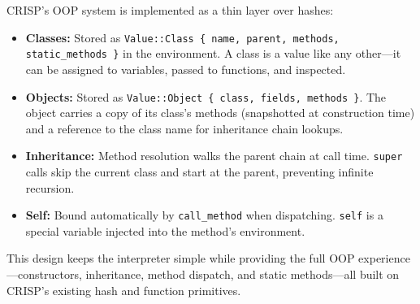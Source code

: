 \begin{tcolorbox}[colback=lightlavender, colframe=softvioletdark, title=\textbf{\textcolor{darkpurple}{Design Note: OOP Implementation}}, fonttitle=\bfseries, sharp corners]
CRISP's OOP system is implemented as a thin layer over hashes:

\begin{itemize}
    \item \textbf{Classes:} Stored as \texttt{Value::Class \{ name, parent, methods, static\_methods \}} in the environment. A class is a value like any other—it can be assigned to variables, passed to functions, and inspected.
    \item \textbf{Objects:} Stored as \texttt{Value::Object \{ class, fields, methods \}}. The object carries a copy of its class's methods (snapshotted at construction time) and a reference to the class name for inheritance chain lookups.
    \item \textbf{Inheritance:} Method resolution walks the parent chain at call time. \texttt{super} calls skip the current class and start at the parent, preventing infinite recursion.
    \item \textbf{Self:} Bound automatically by \texttt{call\_method} when dispatching. \texttt{self} is a special variable injected into the method's environment.
\end{itemize}

This design keeps the interpreter simple while providing the full OOP experience—constructors, inheritance, method dispatch, and static methods—all built on CRISP's existing hash and function primitives.
\end{tcolorbox}
